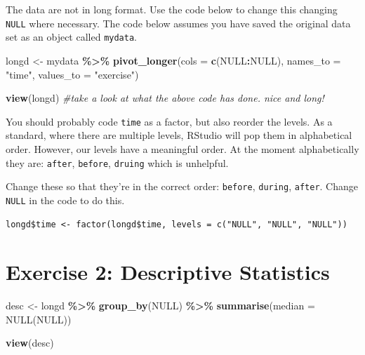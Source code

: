 \documentclass[
]{book}
\newenvironment{Shaded}{\begin{snugshade}}{\end{snugshade}}
\newcommand{\AttributeTok}[1]{\textcolor[rgb]{0.13,0.29,0.53}{#1}}
\newcommand{\CommentTok}[1]{\textcolor[rgb]{0.56,0.35,0.01}{\textit{#1}}}
\newcommand{\ConstantTok}[1]{\textcolor[rgb]{0.56,0.35,0.01}{#1}}
\newcommand{\FunctionTok}[1]{\textcolor[rgb]{0.13,0.29,0.53}{\textbf{#1}}}
\newcommand{\NormalTok}[1]{#1}
\newcommand{\OtherTok}[1]{\textcolor[rgb]{0.56,0.35,0.01}{#1}}
\newcommand{\SpecialCharTok}[1]{\textcolor[rgb]{0.81,0.36,0.00}{\textbf{#1}}}
\newcommand{\StringTok}[1]{\textcolor[rgb]{0.31,0.60,0.02}{#1}}
\let\oldsection\section
\renewcommand{\section}{\needspace{5\baselineskip}\oldsection}
\begin{document}
The data are not in long format. Use the code below to change this changing \texttt{NULL} where necessary. The code below assumes you have saved the original data set as an object called \texttt{mydata}.

\begin{Shaded}
\begin{Highlighting}[]
\NormalTok{longd }\OtherTok{\textless{}{-}}\NormalTok{ mydata }\SpecialCharTok{\%\textgreater{}\%}
  \FunctionTok{pivot\_longer}\NormalTok{(}\AttributeTok{cols =} \FunctionTok{c}\NormalTok{(}\ConstantTok{NULL}\SpecialCharTok{:}\ConstantTok{NULL}\NormalTok{),}
               \AttributeTok{names\_to =} \StringTok{"time"}\NormalTok{,}
               \AttributeTok{values\_to =} \StringTok{"exercise"}\NormalTok{)}
               
\FunctionTok{view}\NormalTok{(longd) }\CommentTok{\#take a look at what the above code has done. nice and long!}
\end{Highlighting}
\end{Shaded}

You should probably code \texttt{time} as a factor, but also reorder the levels. As a standard, where there are multiple levels, RStudio will pop them in alphabetical order. However, our levels have a meaningful order. At the moment alphabetically they are: \texttt{after}, \texttt{before}, \texttt{druing} which is unhelpful.

Change these so that they're in the correct order: \texttt{before}, \texttt{during}, \texttt{after}. Change \texttt{NULL} in the code to do this.

\begin{verbatim}
longd$time <- factor(longd$time, levels = c("NULL", "NULL", "NULL"))
\end{verbatim}

\section{Exercise 2: Descriptive Statistics}\label{exercise-2-descriptive-statistics}

\begin{Shaded}
\begin{Highlighting}[]
\NormalTok{desc }\OtherTok{\textless{}{-}}\NormalTok{ longd }\SpecialCharTok{\%\textgreater{}\%}
  \FunctionTok{group\_by}\NormalTok{(}\ConstantTok{NULL}\NormalTok{) }\SpecialCharTok{\%\textgreater{}\%}
  \FunctionTok{summarise}\NormalTok{(}\AttributeTok{median =} \ConstantTok{NULL}\NormalTok{(}\ConstantTok{NULL}\NormalTok{))}

\FunctionTok{view}\NormalTok{(desc)}
\end{Highlighting}
\end{Shaded}
\end{document}
